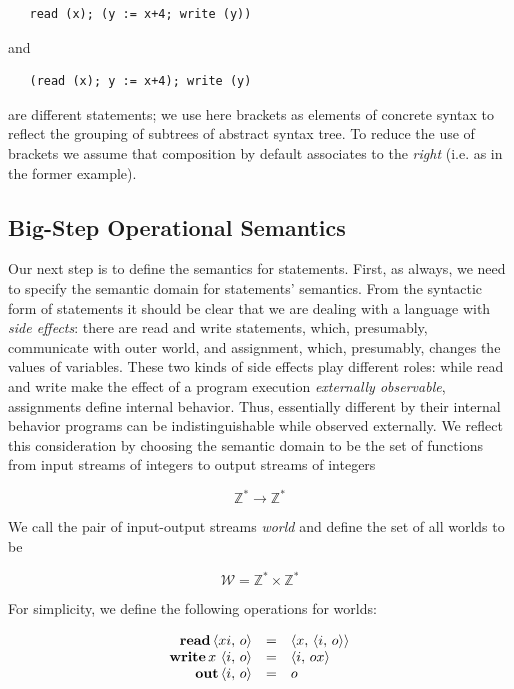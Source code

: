\begin{lstlisting}
   read (x); (y := x+4; write (y))
\end{lstlisting}

and

\begin{lstlisting}
   (read (x); y := x+4); write (y)
\end{lstlisting}

are different statements; we use here brackets as elements of concrete syntax to reflect the grouping of subtrees of abstract syntax tree.
To reduce the use of brackets we assume that composition by default associates to the \emph{right} (i.e. as in the former example).

\subsection{Big-Step Operational Semantics}

Our next step is to define the semantics for statements. First, as always, we need to specify the semantic domain for statements' semantics.
From the syntactic form of statements it should be clear that we are dealing with a language with \emph{side effects}: there are read and write statements,
which, presumably, communicate with outer world, and assignment, which, presumably, changes the values of variables. These two kinds of side effects
play different roles: while read and write make the effect of a program execution \emph{externally observable}, assignments define internal behavior.
Thus, essentially different by their internal behavior programs can be indistinguishable while observed externally. We reflect this consideration by
choosing the semantic domain to be the set of functions from input streams of integers to output streams of integers

\[
\mathbb{Z}^*\to\mathbb{Z}^*
\]

We call the pair of input-output streams \emph{world} and define the set of all worlds to be

\[
  \mathscr W = \mathbb Z^* \times \mathbb Z^*
\]

For simplicity, we define the following operations for worlds:

\[
\begin{array}{rcl}
  \mathbf{read}\,{\left<{xi,\,o}\right>}    & = & \left<{x,\,\left<{i,\,o}\right>}\right>\\
  \mathbf{write}\,{x\,\left<{i,\,o}\right>} & = & \left<{i,\,ox}\right>\\
  \mathbf{out}\,{\left<{i,\,o}\right>}      & = & o
\end{array}
\]


